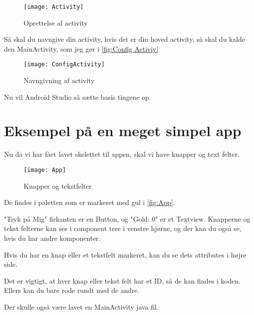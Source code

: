 \begin{figure}[h]
	\texttt{[image: Activity]}
	\caption{Oprettelse af activity}
	\label{fig:Activiy}
\end{figure}

Så skal du navngive din activity, hvis det er din hoved activity, så skal du kalde den MainActivity, som jeg gør i \autoref{fig:Config Activiy} 

\begin{figure}[h]
	\texttt{[image: ConfigActivity]}
	\caption{Navngivning af activity}
	\label{fig:Config Activiy}
\end{figure}

Nu vil Android Studio så sætte basis tingene op.

\FloatBarrier

\section{Eksempel på en meget simpel app}

Nu da vi har fået lavet skelettet til appen, skal vi have knapper og text felter.

\begin{figure}[h]
	\texttt{[image: App]}
	\caption{Knapper og tekstfelter}
	\label{fig:App}
\end{figure}

De findes i paletten som er markeret med gul i \autoref{fig:App}. 

"Tryk på Mig" firkanten er en Button, og "Gold: 0" er et Textview. 
Knapperne og tekst felterne kan ses i component tree i venstre hjørne, og der kan du også se, hvis du har andre komponenter.

Hvis du har en knap eller et tekstfelt markeret, kan du se dets attributes i højre side.

Det er vigtigt, at hver knap eller tekst felt har et ID, så de kan findes i koden. Ellers kan du bare rode rundt med de andre. 

Der skulle også være lavet en MainActivity java fil.

